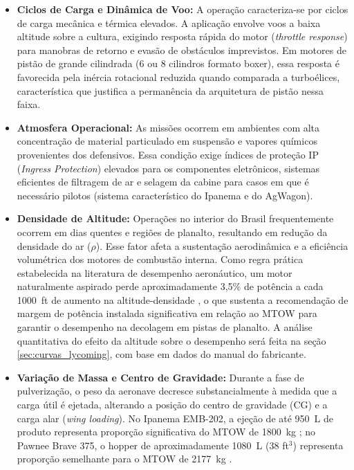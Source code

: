 \documentclass[a4paper,12pt]{article}
\begin{document}
\begin{itemize}
    \item \textbf{Ciclos de Carga e Dinâmica de Voo:} A operação caracteriza-se por ciclos de carga mecânica e térmica elevados. A aplicação envolve voos a baixa altitude sobre a cultura, exigindo resposta rápida do motor (\textit{throttle response}) para manobras de retorno e evasão de obstáculos imprevistos. Em motores de pistão de grande cilindrada (6 ou 8 cilindros formato boxer), essa resposta é favorecida pela inércia rotacional reduzida quando comparada a turboélices, característica que justifica a permanência da arquitetura de pistão nessa faixa.
    
    \item \textbf{Atmosfera Operacional:} As missões ocorrem em ambientes com alta concentração de material particulado em suspensão e vapores químicos provenientes dos defensivos. Essa condição exige índices de proteção IP (\textit{Ingress Protection}) elevados para os componentes eletrônicos, sistemas eficientes de filtragem de ar e selagem da cabine para casos em que é necessário pilotos (sistema característico do Ipanema e do AgWagon).
    
    \item \textbf{Densidade de Altitude:} Operações no interior do Brasil frequentemente ocorrem em dias quentes e regiões de planalto, resultando em redução da densidade do ar ($\rho$). Esse fator afeta a sustentação aerodinâmica e a eficiência volumétrica dos motores de combustão interna. Como regra prática estabelecida na literatura de desempenho aeronáutico, um motor naturalmente aspirado perde aproximadamente 3{,}5\% de potência a cada \SI{1000}{ft} de aumento na altitude-densidade \cite{cfisteph_density}, o que sustenta a recomendação de margem de potência instalada significativa em relação ao MTOW para garantir o desempenho na decolagem em pistas de planalto. A análise quantitativa do efeito da altitude sobre o desempenho será feita na seção \ref{sec:curvas_lycoming}, com base em dados do manual do fabricante.
    
    \item \textbf{Variação de Massa e Centro de Gravidade:} Durante a fase de pulverização, o peso da aeronave decresce substancialmente à medida que a carga útil é ejetada, alterando a posição do centro de gravidade (CG) e a carga alar (\textit{wing loading}). No Ipanema EMB-202, a ejeção de até \SI{950}{L} de produto representa proporção significativa do MTOW de \SI{1800}{kg} \cite{embraer202_wiki}; no Pawnee Brave 375, o hopper de aproximadamente \SI{1080}{L} (38 ft$^3$) representa proporção semelhante para o MTOW de \SI{2177}{kg} \cite{piper_pa36}.
\end{itemize}   
\end{document}
